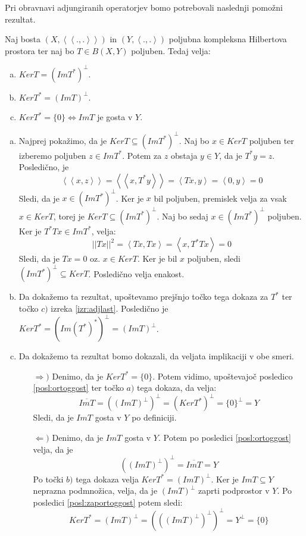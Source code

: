 \documentclass[mat2]{matdelo}
\newcommand{\abs}[1]{\ensuremath{\lvert #1 \rvert}}
\newcommand{\norm}[1]{\abs{\abs{#1}}}
\newcommand{\Sp}[2]{\ensuremath{\left<#1, #2\right>}}
\newcommand{\Spp}[2]{\ensuremath{\left<\left<#1, #2\right>\right>}}
\begin{document}
			Pri obravnavi adjungiranih operatorjev bomo potrebovali naslednji pomožni rezultat.
			
			\begin{lema}
				\label{lem:adjlast2}
				Naj bosta $(X, \Spp{.}{.})$ in $(Y, \Sp{.}{.})$ poljubna kompleksna Hilbertova prostora ter naj bo $T\in B(X, Y)$ poljuben. Tedaj velja: \begin{enumerate}[a)]
					\item $KerT = (ImT^*)^{\bot}$.
					\item $KerT^* = (ImT)^{\bot}$.
					\item $KerT^* = \{0\} \iff ImT$ je gosta v $Y$.
				\end{enumerate}
			\end{lema}
			
			\begin{dokaz}
				\begin{enumerate}[a)]
					\item Najprej pokažimo, da je $KerT \subseteq (ImT^*)^\bot$. Naj bo $x\in KerT$ poljuben ter izberemo poljuben $z\in ImT^*$. Potem za $z$ obstaja $y\in Y$, da je $T^*y = z$. Posledično, je $$\Spp{x}{z} = \Spp{x}{T^*y} = \Sp{Tx}{y} = \Sp{0}{y} = 0$$
					Sledi, da je $x\in (ImT^*)^\bot$. Ker je $x$ bil poljuben, premislek velja za vsak $x\in KerT$, torej je $KerT \subseteq (ImT^*)^\bot$.
					Naj bo sedaj $x\in (ImT^*)^\bot$ poljuben. Ker je $T^*Tx \in ImT^*$, velja: $$\norm{Tx}^2 = \Sp{Tx}{Tx} = \Sp{x}{T^*Tx}= 0$$
					Sledi, da je $Tx = 0$ oz. $x\in KerT$. Ker je bil $x$ poljuben, sledi $(ImT^*)^\bot \subseteq KerT$. Posledično velja enakost.
					\item Da dokažemo ta rezultat, upoštevamo prejšnjo točko tega dokaza za $T^*$ ter točko $c)$ izreka \ref{izr:adjlast}. Posledično je $KerT^* = (Im(T^*)^*)^\bot = (ImT)^\bot$.
					\item Da dokažemo ta rezultat bomo dokazali, da veljata implikaciji v obe smeri. \begin{itemize}
						\item[$\Rightarrow)$] Denimo, da je $KerT^* = \{0\}$. Potem vidimo, upoštevajoč posledico \ref{posl:ortoggost} ter točko $a)$ tega dokaza, da velja: $$\overline{ImT} = ((ImT)^\bot)^\bot = (KerT^*)^\bot = \{0\}^\bot = Y$$
						Sledi, da je $ImT$ gosta v $Y$ po definiciji.
						\item[$\Leftarrow)$] Denimo, da je $ImT$ gosta v $Y$. Potem po posledici \ref{posl:ortoggost} velja, da je $$((ImT)^{\bot})^\bot = \overline{ImT} = Y$$ Po točki $b)$ tega dokaza velja $KerT^* = (ImT)^\bot$. Ker je $ImT\subseteq Y$ neprazna podmnožica, velja, da je $(ImT)^\bot$ zaprti podprostor v $Y$. Po posledici \ref{posl:zaportoggost} potem sledi: $$KerT^* = (ImT)^\bot =(((ImT)^\bot)^\bot)^\bot = Y^\bot = \{0\}$$
					\end{itemize} 
					
				\end{enumerate}
			\end{dokaz}
\end{document}
